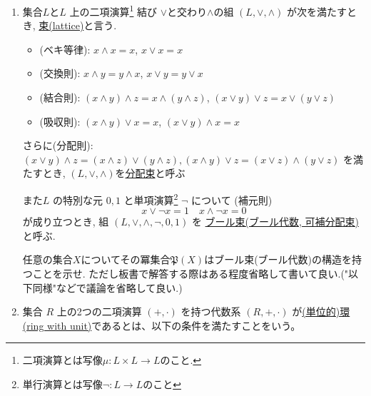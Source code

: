 \documentclass[dvipdfmx,a4paper,11pt]{article}
\theoremstyle{definition}
\begin{document}
\begin{enumerate}[label=\textbf{問}\ref*{sec-1}.\arabic*]
\item \label{1-bool-alge}集合$L$と\( L \) 上の二項演算\footnote{二項演算とは写像$\mu : L \times L \to L$のこと. }
結び \( \vee \)と交わり\( \wedge \)の組
 \( (L, \vee, \wedge) \) が次を満たすとき, \underline{束(lattice)}と言う. 
\begin{itemize}
 \setlength{\parskip}{0cm}
  \setlength{\itemsep}{0pt}
   \item (ベキ等律): $x \wedge x =x$, $x \vee x =x$
    \item (交換則): \( x \wedge y = y \wedge x \), \( x \vee y = y \vee x \)
    \item (結合則): \( (x \wedge y) \wedge z = x \wedge (y \wedge z) \), \( (x \vee y) \vee z = x \vee (y \vee z) \)
    \item (吸収則): \( (x \wedge y) \vee x = x \),  \( (x \vee y) \wedge x = x \)
\end{itemize}

さらに(分配則):
$ 
(x \vee y) \wedge z = (x \wedge z) \vee (y \wedge z), 
 (x \wedge y) \vee z = (x \vee z) \wedge (y \vee z) 
 $
 を満たすとき, $( L, \vee, \wedge ) $を\underline{分配束}と呼ぶ

また\( L \) の特別な元 \( 0, 1 \) と単項演算\footnote{単行演算とは写像$\neg : L \to L$のこと} \( \neg \) について
(補元則)
$$ x \vee \neg x = 1 
\quad
x \wedge \neg x = 0 
$$
が成り立つとき, 組 \(  (L, \vee, \wedge, \neg, 0, 1) \) を \underline{ブール束(ブール代数, 可補分配束)}と呼ぶ.

任意の集合$X$についてその冪集合$\mathfrak{P}(X)$はブール束(ブール代数)の構造を持つことを示せ.
ただし板書で解答する際はある程度省略して書いて良い.("以下同様"などで議論を省略して良い.)

\item \label{1-boolean-eing} 集合 \( R \) 上の2つの二項演算 \( (+, \cdot) \) を持つ代数系 \( (R, +, \cdot) \) が\underline{(単位的)環(ring with unit)}であるとは、以下の条件を満たすことをいう。


\end{enumerate}
\end{document}
